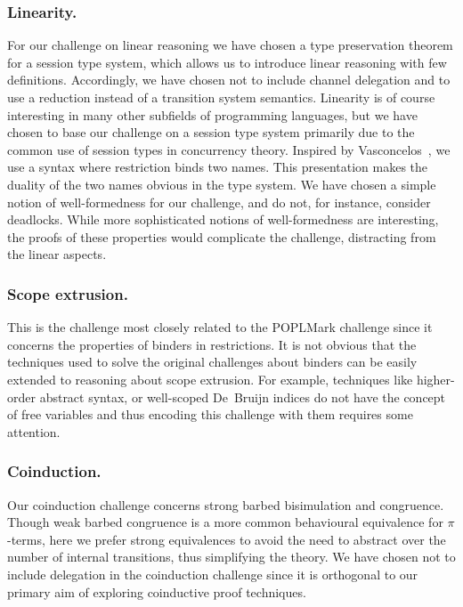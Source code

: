 \documentclass[runningheads]{llncs}
\begin{document}

\subsubsection{Linearity.}
For our challenge on linear reasoning we have chosen a type preservation theorem
for a session type system, which allows us to introduce linear
reasoning with few definitions. Accordingly, we have chosen not to
include channel delegation and to use a reduction instead of a
transition system semantics.
Linearity is of course interesting in many other subfields of programming languages, but we have chosen to base our challenge on a session type system primarily due to the common use of session types in concurrency theory.
Inspired by Vasconcelos~\cite{Vasconcelos2012}, we use a syntax where
restriction binds two names. This presentation makes the duality
of the two names obvious in the type system.
We have chosen a simple notion of well-formedness for our challenge,
and do not, for instance, consider deadlocks. While more
sophisticated notions of well-formedness are interesting, the
proofs of these properties would complicate the challenge, distracting from the linear aspects.

\subsubsection{Scope extrusion.}
This is the challenge most closely related to the POPLMark
challenge since it concerns the properties of binders in restrictions.
It is not obvious that the techniques used to solve the original challenges about binders can be easily extended to reasoning about scope extrusion.
For example, techniques like higher-order abstract syntax, or well-scoped
De\ Bruijn indices do not have the concept of free variables and thus encoding this challenge with them requires some attention.

\subsubsection{Coinduction.}

Our coinduction challenge concerns strong barbed bisimulation and congruence.
Though weak barbed congruence is a more common behavioural equivalence for \(\pi\)-terms, here we prefer strong equivalences to avoid the need to abstract over the number of internal transitions, %
thus simplifying the theory.
We have chosen not to include delegation in the coinduction challenge since it is orthogonal to our primary aim of exploring coinductive proof techniques.
\end{document}
